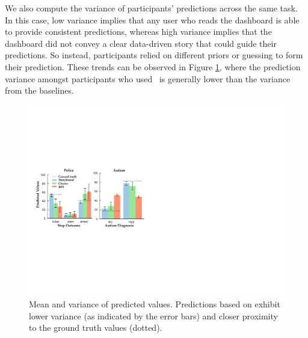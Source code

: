 \par We also compute the variance of participants' predictions across the same task. In this case, low variance implies that any user who reads the dashboard is able to provide consistent predictions, whereas high variance implies that the dashboard did not convey a clear data-driven story that could guide their predictions. So instead, participants relied on different priors or guessing to form their prediction. These trends can be observed in Figure \ref{fig:actual_predictions}, where the prediction variance amongst participants who used \system\ is generally lower than the variance from the baselines.
\begin{figure}[h!]
\centering
\includegraphics[width=\linewidth]{figures/prediction.pdf}
\caption{Mean and variance of predicted values. Predictions based on \system exhibit lower variance (as indicated by the error bars) and closer proximity to the ground truth values (dotted).}
\label{fig:actual_predictions}
\end{figure}